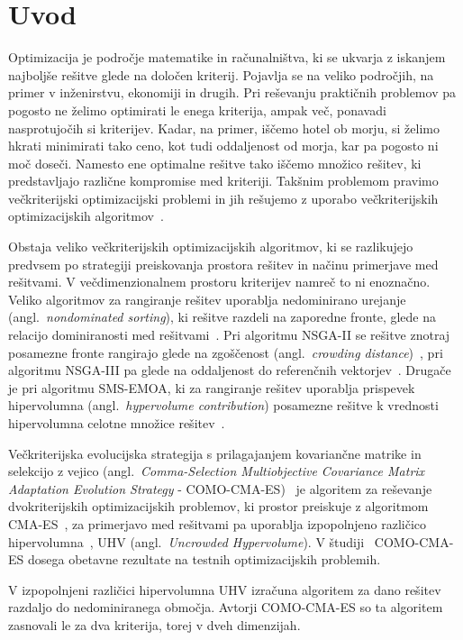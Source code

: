 \section{Uvod}
\label{sec:uvod}

Optimizacija je področje matematike in računalništva, ki se ukvarja z iskanjem najboljše rešitve glede na določen kriterij. Pojavlja se na veliko področjih, na primer v inženirstvu, ekonomiji in drugih. Pri reševanju praktičnih problemov pa pogosto ne želimo optimirati le enega kriterija, ampak več, ponavadi nasprotujočih si kriterijev. Kadar, na primer, iščemo hotel ob morju, si želimo hkrati minimirati tako ceno, kot tudi oddaljenost od morja, kar pa pogosto ni moč doseči. Namesto ene optimalne rešitve tako iščemo množico rešitev, ki predstavljajo različne kompromise med kriteriji. Takšnim problemom pravimo večkriterijski optimizacijski problemi in jih rešujemo z uporabo večkriterijskih optimizacijskih algoritmov~\cite{Deb2015}.

Obstaja veliko večkriterijskih optimizacijskih algoritmov, ki se razlikujejo predvsem po strategiji preiskovanja prostora rešitev in načinu primerjave med rešitvami. V večdimenzionalnem prostoru kriterijev namreč to ni enoznačno. Veliko algoritmov za rangiranje rešitev uporablja nedominirano urejanje (angl.~\textit{nondominated
sorting}), ki rešitve razdeli na zaporedne fronte, glede na relacijo dominiranosti med rešitvami~\cite{nsga2}. Pri algoritmu NSGA-II se rešitve znotraj posamezne fronte rangirajo glede na zgoščenost (angl.~\textit{crowding distance})~\cite{nsga2}, pri algoritmu NSGA-III pa glede na oddaljenost do referenčnih vektorjev~\cite{nsga3}. Drugače je pri algoritmu SMS-EMOA, ki za rangiranje rešitev uporablja prispevek hipervolumna (angl.~\textit{hypervolume contribution}) posamezne rešitve k vrednosti hipervolumna celotne množice rešitev~\cite{smsemoa}.  

Večkriterijska evolucijska strategija s prilagajanjem kovariančne matrike in selekcijo z vejico (angl.~\textit{Comma-Selection Multiobjective Covariance Matrix Adaptation Evolution Strategy} - COMO-CMA-ES)~\cite{toure-como-cma-es} je algoritem za reševanje dvokriterijskih optimizacijskih problemov, ki prostor preiskuje z algoritmom CMA-ES~\cite{cmaes}, za primerjavo med rešitvami pa uporablja izpopolnjeno različico hipervolumna~\cite{definitions}, UHV (angl.~\textit{Uncrowded Hypervolume}). V študiji~\cite{toure-como-cma-es} COMO-CMA-ES dosega obetavne rezultate na testnih optimizacijskih problemih. 

V izpopolnjeni različici hipervolumna UHV izračuna algoritem za dano rešitev razdaljo do nedominiranega območja. Avtorji COMO-CMA-ES so ta algoritem zasnovali le za dva kriterija, torej v dveh dimenzijah. 


